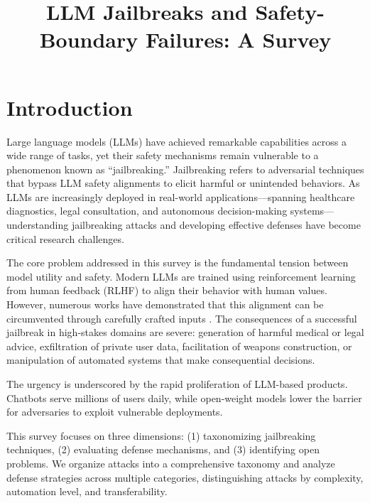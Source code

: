 \documentclass[conference]{IEEEtran}
\begin{document}
\title{LLM Jailbreaks and Safety-Boundary Failures: A Survey}

\author{
}

\maketitle


\section{Introduction}

Large language models (LLMs) have achieved remarkable capabilities across a wide range of tasks, yet their safety mechanisms remain vulnerable to a phenomenon known as ``jailbreaking.'' Jailbreaking refers to adversarial techniques that bypass LLM safety alignments to elicit harmful or unintended behaviors. As LLMs are increasingly deployed in real-world applications---spanning healthcare diagnostics, legal consultation, and autonomous decision-making systems---understanding jailbreaking attacks and developing effective defenses have become critical research challenges.

The core problem addressed in this survey is the fundamental tension between model utility and safety. Modern LLMs are trained using reinforcement learning from human feedback (RLHF) \cite{bai2022constitutional} to align their behavior with human values. However, numerous works have demonstrated that this alignment can be circumvented through carefully crafted inputs \cite{zou2023universal, wei2023jailbroken}. The consequences of a successful jailbreak in high-stakes domains are severe: generation of harmful medical or legal advice, exfiltration of private user data, facilitation of weapons construction, or manipulation of automated systems that make consequential decisions.

The urgency is underscored by the rapid proliferation of LLM-based products. Chatbots serve millions of users daily, while open-weight models lower the barrier for adversaries to exploit vulnerable deployments.

This survey focuses on three dimensions: (1) taxonomizing jailbreaking techniques, (2) evaluating defense mechanisms, and (3) identifying open problems. We organize attacks into a comprehensive taxonomy and analyze defense strategies across multiple categories, distinguishing attacks by complexity, automation level, and transferability.
\end{document}

